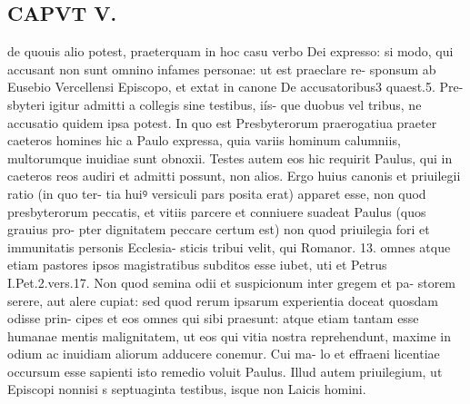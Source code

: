 \documentclass{article}
\begin{document}
\begin{pages}
\section*{CAPVT  V. }
\marginpar{[ p.815 ]}de quouis alio potest, praeterquam in hoc casu verbo Dei expresso: si modo, qui accusant non sunt omnino infames personae: ut est praeclare re- sponsum ab Eusebio Vercellensi Episcopo, et extat in canone De accusatoribus3 quaest.5. Pre- sbyteri igitur admitti a collegis sine testibus, iís- que duobus vel tribus, ne accusatio quidem ipsa potest. In quo est Presbyterorum praerogatiua praeter caeteros homines hic a Paulo expressa, quia variis hominum calumniis, multorumque inuidiae sunt obnoxii. Testes autem eos hic requirit Paulus, qui in caeteros reos audiri et admitti possunt, non alios. Ergo huius canonis et priuilegii ratio (in quo ter- tia huiꝰ versiculi pars posita erat) apparet esse, non quod presbyterorum peccatis, et vitiis parcere et conniuere suadeat Paulus (quos grauius pro- pter dignitatem peccare certum est) non quod priuilegia fori et immunitatis personis Ecclesia- sticis tribui velit, qui Romanor. 13. omnes atque etiam pastores ipsos magistratibus subditos esse iubet, uti et Petrus I.Pet.2.vers.17. Non quod semina odii et suspicionum inter gregem et pa- storem serere, aut alere cupiat: sed quod rerum ipsarum experientia doceat quosdam odisse prin- cipes et eos omnes qui sibi praesunt: atque etiam tantam esse humanae mentis malignitatem, ut eos qui vitia nostra reprehendunt, maxime in odium ac inuidiam aliorum adducere conemur. Cui ma- lo et effraeni licentiae occursum esse sapienti isto remedio voluit Paulus. Illud autem priuilegium, ut Episcopi nonnisi s septuaginta testibus, isque non Laicis homini. 

\end{pages}
\end{document}
